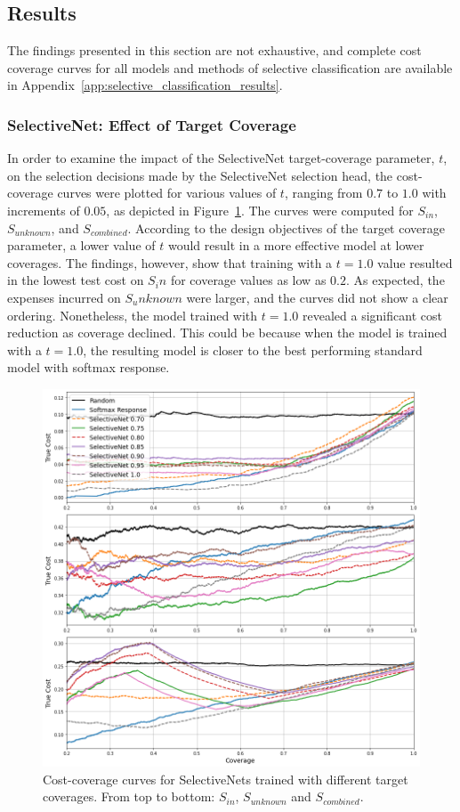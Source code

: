 \subsection{Results}
The findings presented in this section are not exhaustive, and complete cost coverage curves for all models and methods of selective classification are available in Appendix~\ref{app:selective_classification_results}.

\subsubsection{SelectiveNet: Effect of Target Coverage}
In order to examine the impact of the SelectiveNet target-coverage parameter, $t$, on the selection decisions made by the SelectiveNet selection head, the cost-coverage curves were plotted for various values of $t$, ranging from $0.7$ to $1.0$ with increments of $0.05$, as depicted in Figure~\ref{fig:binary-selectivenet}. The curves were computed for $S_{in}$, $S_{unknown}$, and $S_{combined}$. According to the design objectives of the target coverage parameter, a lower value of $t$ would result in a more effective model at lower coverages. The findings, however, show that training with a $t=1.0$ value resulted in the lowest test cost on $S_in$ for coverage values as low as $0.2$. As expected, the expenses incurred on $S_unknown$ were larger, and the curves did not show a clear ordering. Nonetheless, the model trained with $t=1.0$ revealed a significant cost reduction as coverage declined. This could be because when the model is trained with a $t=1.0$, the resulting model is closer to the best performing standard model with softmax response.

\begin{figure}[!h]
	\centering
	\includegraphics[width=\textwidth]{images/binary_selectivenet.png}
	\caption{Cost-coverage curves for SelectiveNets trained with different target coverages. From top to bottom: $S_{in}$, $S_{unknown}$ and $S_{combined}$.}
	\label{fig:binary-selectivenet}
\end{figure}

